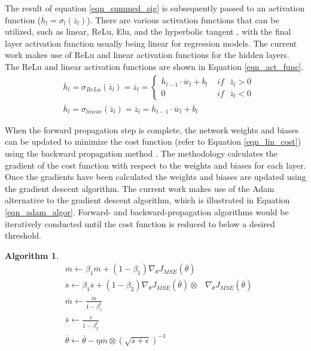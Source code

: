 \documentclass[a4paper,fleqn]{cas-dc}
\newtheorem{theorem}{Algorithm}
\begin{document}
The result of equation \ref{eqn_summed_sig} is subsequently passed to an activation function ($\overline{h}_l = \sigma_l(\overline{z}_l)$). There are various activation functions that can be utilized, such as linear, ReLu, Elu, and the hyperbolic tangent \citep{goodfellow}, with the final layer activation function usually being linear for regression models. The current work makes use of ReLu and linear activation functions for the hidden layers. The ReLu and linear activation functions are shown in Equation \ref{eqn_act_func}.
\begin{equation}\label{eqn_act_func}
\begin{split}
&\overline{h}_l=\sigma_{ReLu}(\overline{z}_l) = \overline{z}_l =  
	\begin{cases}
	 \overline{h}_{l-1}\cdot\overline{w}_l+\overline{b}_l\,\, &if\,\,\,\, \overline{z}_l>0\\
	 0\,\, &if\,\,\,\, \overline{z}_l<0
	\end{cases}\\
&\overline{h}_l=\sigma_{linear}(\overline{z}_l) = \overline{z}_l = \overline{h}_{l-1}\cdot\overline{w}_l+\overline{b}_l
\end{split}
\end{equation}

When the forward propagation step is complete, the network weights and biases can be updated to minimize the cost function (refer to Equation \ref{eqn_lin_cost}) using the backward propagation method \cite{Rumelhart1986}. The methodology calculates the gradient of the cost function with respect to the weights and biases for each layer. Once the gradients have been calculated the weights and biases are updated using the gradient descent algorithm. The current work makes use of the Adam \cite{goodfellow} alternative to the gradient descent algorithm, which is illustrated in Equation \ref{eqn_adam_algor}. Forward- and backward-propagation algorithms would be iteratively conducted until the cost function is reduced to below a desired threshold.

\begin{theorem} 
\begin{equation}\label{eqn_adam_algor} 
\begin{split}
&\overline{m}\leftarrow \beta_1\overline{m}+(1-\beta_1)\nabla_{\theta}J_{MSE}(\overline{\theta})\\
&\overline{s}\leftarrow \beta_1\overline{s}+(1-\beta_2)\nabla_{\theta}J_{MSE}(\overline{\theta})\otimes&\nabla_{\theta}J_{MSE}(\overline{\theta})\\
&\overline{m}\leftarrow\frac{\overline{m}}{1-\beta_1^t} \\
&\overline{s}\leftarrow\frac{\overline{s}}{1-\beta_2^t}\\
&\overline{\theta}\leftarrow\overline{\theta}-\eta\overline{m}\otimes(\sqrt{\overline{s}+\epsilon})^{-1}\\
\end{split}
\end{equation}
\end{theorem}
\end{document}

